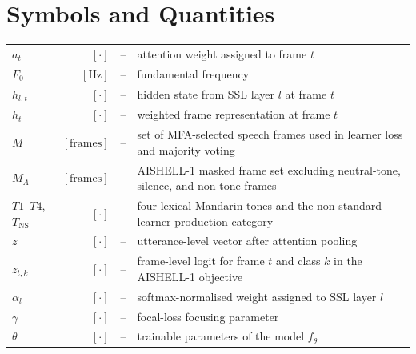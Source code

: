 \section*{Symbols and Quantities}
\noindent
\begin{tabular}{>{\raggedright\arraybackslash}p{} r c >{\raggedright\arraybackslash}p{}}
  $a_t$        & $[\cdot]$      & -- & attention weight assigned to frame $t$ \\
  $F_0$        & $[\text{Hz}]$  & -- & fundamental frequency \\
  $h_{l,t}$    & $[\cdot]$      & -- & hidden state from SSL layer $l$ at frame $t$ \\
  $h_t$        & $[\cdot]$      & -- & weighted frame representation at frame $t$ \\
  $M$          & $[\text{frames}]$ & -- & set of MFA-selected speech frames used in learner loss and majority voting \\
  $M_A$        & $[\text{frames}]$ & -- & AISHELL-1 masked frame set excluding neutral-tone, silence, and non-tone frames \\
  $T1$--$T4$, $T_{\mathrm{NS}}$ & $[\cdot]$  & -- & four lexical Mandarin tones and the non-standard learner-production category \\
  $z$          & $[\cdot]$      & -- & utterance-level vector after attention pooling \\
  $z_{t,k}$    & $[\cdot]$      & -- & frame-level logit for frame $t$ and class $k$ in the AISHELL-1 objective \\
  $\alpha_l$   & $[\cdot]$      & -- & softmax-normalised weight assigned to SSL layer $l$ \\
  $\gamma$     & $[\cdot]$      & -- & focal-loss focusing parameter \\
  $\theta$     & $[\cdot]$      & -- & trainable parameters of the model $f_{\theta}$ \\
\end{tabular}
